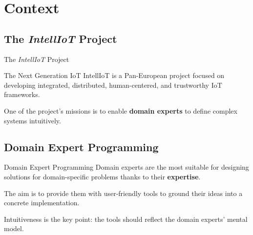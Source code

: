 \section{Context}

\subsection{The \textit{IntellIoT} Project}

\begin{frame}{The \textit{IntellIoT} Project}
    \begin{block}{The Next Generation IoT}
        IntellIoT is a Pan-European project focused on developing integrated, distributed, human-centered, and trustworthy IoT frameworks.
    \end{block}

    \vspace{1.5cm}

    One of the project's missions is to enable \textbf{domain experts} to define complex systems intuitively.
\end{frame}

\subsection{Domain Expert Programming}

\begin{frame}{Domain Expert Programming}
    Domain experts are the most suitable for designing solutions for domain-specific problems thanks to their \textbf{expertise}.

    \vspace{1cm}

    The aim is to provide them with user-friendly tools to ground their ideas into a concrete implementation.

    \vspace{1cm}

    Intuitiveness is the key point: the tools should reflect the domain experts' mental model.
\end{frame}